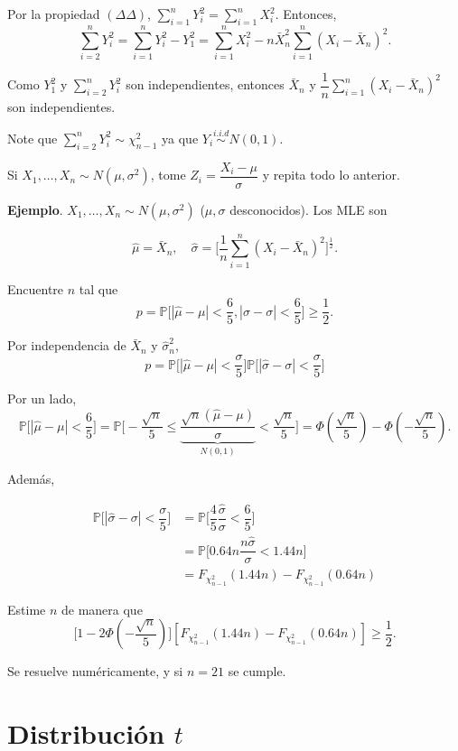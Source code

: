 \documentclass[
  12pt,
]{book}
\begin{document}
Por la propiedad \((\Delta \Delta)\), \(\displaystyle\sum_{i=1}^n Y_i^2 = \displaystyle\sum_{i=1}^n X_i^2\). Entonces,
\[ \sum_{i=2}^nY_i^2 = \sum_{i=1}^nY_i^2 - Y_1^2 = \sum_{i=1}^nX_i^2-n\bar X_n^2\sum_{i=1}^n(X_i-\bar X_n)^2. \]

Como \(Y_1^2\) y \(\sum_{i=2}^nY_i^2\) son independientes, entonces \(\bar X_n\) y \(\dfrac{1}n \sum_{i=1}^n(X_i-\bar X_n)^2\) son independientes.

Note que \(\sum_{i=2}^n Y_i^2 \sim \chi^2_{n-1}\) ya que \(Y_i \stackrel{i.i.d}{\sim} N(0,1)\).

Si \(X_1,\dots,X_n \sim N(\mu, \sigma^2)\), tome \(Z_i = \dfrac{X_i-\mu}\sigma\) y repita todo lo anterior.

\textbf{Ejemplo}. \(X_1,\dots,X_n\sim N(\mu,\sigma^2)\) (\(\mu,\sigma\) desconocidos). Los MLE son

\[\hat \mu = \bar X_n,\quad \hat\sigma = \bigg[\dfrac{1}{n}\sum_{i=1}^n(X_i-\bar X_n)^2 \bigg]^{\frac 12}.\]

Encuentre \(n\) tal que
\[p = \mathbb P \bigg[|\hat\mu-\mu|<\dfrac 65, |\hat\sigma-\sigma|<\dfrac 65\bigg] \geq \dfrac 12. \]

Por independencia de \(\bar X_n\) y \(\hat\sigma^2_n\),
\[p=  \mathbb P \bigg[|\hat\mu-\mu|<\dfrac \sigma5\bigg] \mathbb P \bigg[|\hat\sigma-\sigma|<\dfrac \sigma5\bigg]\]

Por un lado,
\[\mathbb P \bigg[|\hat\mu-\mu|<\dfrac 65\bigg] = \mathbb P \bigg[-\dfrac{\sqrt n}5\leq \underbrace{\dfrac{\sqrt{n}(\hat\mu-\mu)}\sigma}_{N(0,1)} <\dfrac {\sqrt n}{5}\bigg] = \Phi\left(\dfrac{\sqrt n}{5}\right)-\Phi\left(-\dfrac{\sqrt n}{5}\right).\]

Además,

\begin{align*} 
\mathbb P \bigg[|\hat\sigma-\sigma|<\dfrac \sigma5\bigg] & = \mathbb P \bigg[\dfrac 45 \dfrac{\hat\sigma}{\sigma}<\dfrac 65\bigg]\\
& = \mathbb P \bigg[0.64 n \dfrac{n\hat\sigma}{\sigma}<1.44n\bigg]\\
& = F_{\chi^2_{n-1}}(1.44n)-F_{\chi^2_{n-1}}(0.64n)
\end{align*}

Estime \(n\) de manera que
\[\bigg[1-2\Phi\left(-\dfrac{\sqrt n}{5}\right)\bigg][F_{\chi^2_{n-1}}(1.44n)-F_{\chi^2_{n-1}}(0.64n)] \geq \dfrac 12.\]

Se resuelve numéricamente, y si \(n=21\) se cumple.

\hypertarget{distribuciuxf3n-t}{%
\section{\texorpdfstring{Distribución \(t\)}{Distribución t}}\label{distribuciuxf3n-t}}
\end{document}
